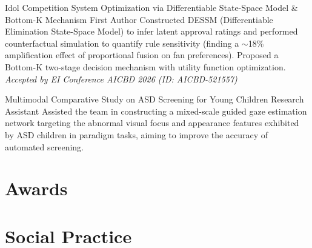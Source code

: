 \documentclass[10pt,a4paper,sans]{moderncv}
\begin{document}
  {Idol Competition System Optimization via Differentiable State-Space Model \& Bottom-K Mechanism}
  {First Author}{}{}
  {Constructed DESSM (Differentiable Elimination State-Space Model) to infer latent approval ratings
   and performed counterfactual simulation to quantify rule sensitivity (finding a $\sim$18\%
   amplification effect of proportional fusion on fan preferences). Proposed a Bottom-K two-stage
   decision mechanism with utility function optimization.\\
   \textit{Accepted by EI Conference AICBD 2026 (ID: AICBD-521557)}}

  {Multimodal Comparative Study on ASD Screening for Young Children}
  {Research Assistant}{}{}
  {Assisted the team in constructing a mixed-scale guided gaze estimation network targeting the
   abnormal visual focus and appearance features exhibited by ASD children in paradigm tasks,
   aiming to improve the accuracy of automated screening.}

\section{Awards}


\section{Social Practice}

\end{document}
